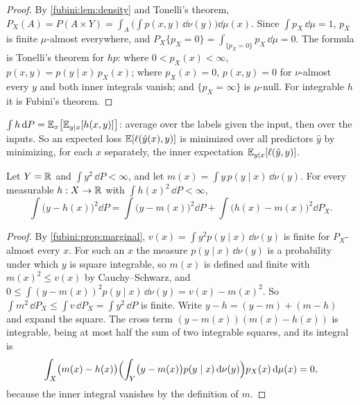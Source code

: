 \begin{notechapter}
\begin{proof}
By \cref{fubini:lem:density} and Tonelli's theorem,
$P_X(A) = P(A\times Y) = \int_A\bigl(\int p(x, y)\,\dd\nu(y)\bigr)\dd\mu(x)$.
Since $\int p_X\,\dd\mu = 1$, $p_X$ is finite $\mu$-almost everywhere,
and $P_X\{p_X = 0\} = \int_{\{p_X = 0\}}p_X\,\dd\mu = 0$. The formula is
Tonelli's theorem for $hp$: where $0 < p_X(x) < \infty$,
$p(x, y) = p(y\mid x)\,p_X(x)$; where $p_X(x) = 0$, $p(x, y) = 0$ for
$\nu$-almost every $y$ and both inner integrals vanish; and
$\{p_X = \infty\}$ is $\mu$-null. For integrable $h$ it is Fubini's
theorem.
\end{proof}

\begin{keyidea}
$\int h\,\mathrm{d} P = \mathbb{E}_x\bigl[\mathbb{E}_{y\mid x}[h(x, y)]\bigr]$: average over
the labels given the input, then over the inputs. So an expected loss
$\mathbb{E}[\ell(\hat y(x), y)]$ is minimized over all predictors $\hat y$ by
minimizing, for each $x$ separately, the inner expectation
$\mathbb{E}_{y\mid x}[\ell(\hat y, y)]$.
\end{keyidea}

\begin{proposition}\label{fubini:prop:regression}
Let $Y = \mathbb{R}$ and $\int y^2\,\dd P < \infty$, and let
$m(x) = \int y\,p(y\mid x)\,\dd\nu(y)$. For every measurable
$h:X\to\mathbb{R}$ with $\int h(x)^2\,\dd P < \infty$,
\[
  \int\bigl(y - h(x)\bigr)^2\dd P
  = \int\bigl(y - m(x)\bigr)^2\dd P
  + \int\bigl(h(x) - m(x)\bigr)^2\dd P_X .
\]
\end{proposition}

\begin{proof}
By \cref{fubini:prop:marginal}, $v(x) = \int y^2p(y\mid x)\,\dd\nu(y)$ is
finite for $P_X$-almost every $x$. For such an $x$ the measure
$p(y\mid x)\,\dd\nu(y)$ is a probability under which $y$ is square
integrable, so $m(x)$ is defined and finite with $m(x)^2\leq v(x)$ by
Cauchy--Schwarz, and
$0\leq\int(y - m(x))^2p(y\mid x)\,\dd\nu(y) = v(x) - m(x)^2$. So
$\int m^2\,\dd P_X\leq\int v\,\dd P_X = \int y^2\,\dd P$ is finite. Write
$y - h = (y - m) + (m - h)$ and expand the square. The cross term
$(y - m(x))(m(x) - h(x))$ is integrable, being at most half the sum of
two integrable squares, and its integral is
\[
  \int_X\bigl(m(x) - h(x)\bigr)
  \Bigl(\int_Y\bigl(y - m(x)\bigr)p(y\mid x)\,\mathrm{d}\nu(y)\Bigr)
  p_X(x)\,\mathrm{d}\mu(x) = 0 ,
\]
because the inner integral vanishes by the definition of $m$.
\end{proof}


\end{notechapter}
